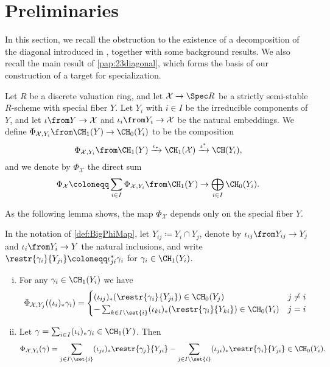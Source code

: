 \section{Preliminaries}
In this section, we recall the obstruction to the existence of a decomposition of the diagonal introduced in \cite{PavicSchreieder}, together with some background results. We also recall the main result of \cref{pap:23diagonal}, which forms the basis of our construction of a target for specialization.

\begin{definition}
  \label{def:BigPhiMap}
  Let $R$ be a discrete valuation ring, and let $\mathcal{X} \to \Spec R$ be a strictly semi-stable $R$-scheme with special fiber $Y$. Let $Y_i$ with $i \in I$ be the irreducible components of $Y$, and let $\iota \from Y \to \mathcal{X}$ and $\iota_i \from Y_i \to \mathcal{X}$ be the natural embeddings. We define $\Phi_{\mathcal{X},Y_i} \from \CH_1(Y) \to \CH_0(Y_i)$ to be the composition
\[ \Phi_{\mathcal{X},Y_i} \from \CH_1(Y) \xrightarrow{\iota_*} \CH_1(\mathcal{X}) \xrightarrow{\iota^*} \CH(Y_i), \]
and we denote by $\Phi_{\mathcal{X}}$ the direct sum
\[ \Phi_{\mathcal{X}} \coloneqq \sum_{i \in I}  \Phi_{\mathcal{X},Y_i}  \from \CH_1(Y) \to  \bigoplus_{i \in I}\CH_0(Y_i).\]
\end{definition}

As the following lemma shows, the map $\Phi_{\mathcal{X}}$ depends only on the special fiber $Y$.
\begin{lemma}
  \label{lem:BigPhiSpecial}
  In the notation of \cref{def:BigPhiMap}, let $Y_{ij} \coloneqq Y_i \cap Y_j$, denote by $\iota_{ij} \from Y_{ij} \to Y_j$ and $\iota_i \from Y_i \to Y$ the natural inclusions, and write $\restr{\gamma_i}{Y_{ji}} \coloneqq \iota_{ji}^*\gamma_i$ for $\gamma_i \in \CH_1(Y_i)$.   
  \begin{enumerate}[i)]
  \item For any $\gamma_i \in \CH_1(Y_i)$ we have
\[\Phi_{\mathcal{X},Y_j}((\iota_i)_*\gamma_i) = 
\begin{cases}
  (\iota_{ij})_*(\restr{\gamma_i}{Y_{ji}}) \in \CH_0(Y_j) & j \neq i \\
  -\sum_{k \in I \setminus \set{i}} (\iota_{ki})_*(\restr{\gamma_i}{Y_{ki}}) \in \CH_0(Y_i) & j = i
\end{cases}
 \]
\item Let $\gamma = \sum_{i \in I} (\iota_i)_* \gamma_i \in \CH_1(Y)$. Then
\[\Phi_{\mathcal{X},Y_i}(\gamma) = \sum_{j \in I \setminus \set{i}} (\iota_{ji})_* \restr{\gamma_j}{Y_{ji}} - \sum_{j \in I \setminus \set{i}} (\iota_{ji})_* \restr{\gamma_i}{Y_{ji}} \in \CH_0(Y_i). \]
  \end{enumerate}
\end{lemma}

